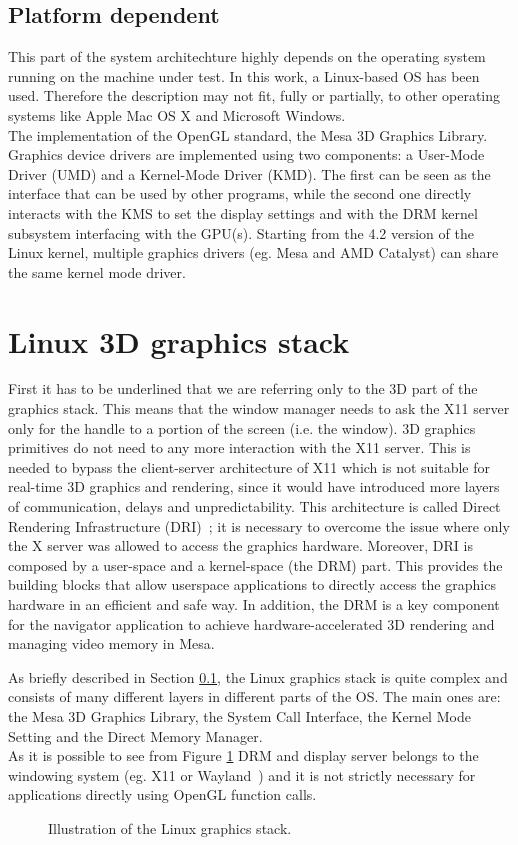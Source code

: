 \subsection{Platform dependent} \label{sec:platform_dependent}
This part of the system architechture highly depends on the operating system
running on the machine under test. In this work, a Linux-based OS has been used.
Therefore the description may not fit, fully or partially, to other operating
systems like Apple Mac OS X and Microsoft Windows.\\
The implementation of the OpenGL standard, the Mesa 3D Graphics Library. 
Graphics device drivers are implemented using two components: a User-Mode Driver
(UMD) and a Kernel-Mode Driver (KMD). The first can be seen as the interface
that can be used by other programs, while the second one directly interacts
with the KMS to set the display settings and with the DRM kernel subsystem
interfacing with the GPU(s). Starting from the 4.2 version of the Linux kernel,
multiple graphics drivers (eg. Mesa and AMD Catalyst) can share the same kernel
mode driver.


\section{Linux 3D graphics stack}
First it has to be underlined that we are referring only to the 3D part of the
graphics stack. This means that the window manager needs to ask the X11 server
only for the handle to a portion of the screen (i.e. the window).
3D graphics primitives do not need to any more interaction with the X11 server. This
is needed to bypass the client-server architecture of X11 which is not suitable for
real-time 3D graphics and rendering, since it would have introduced more layers
of communication, delays and unpredictability. This architecture is called
Direct Rendering Infrastructure (DRI)~\cite{paul2000introduction}; it is
necessary to overcome the issue where only the X server was allowed to access
the graphics hardware. Moreover, DRI is composed by a user-space and a kernel-space
(the DRM) part. This provides the building blocks that allow userspace applications
to directly access the graphics hardware in an efficient and safe way.
In addition, the DRM is a key component for the navigator application to achieve
hardware-accelerated 3D rendering and managing video memory in Mesa.

As briefly described in Section \ref{sec:platform_dependent}, the Linux graphics
stack is quite complex and consists of many different layers in different parts
of the OS. The main ones are: the Mesa 3D Graphics Library, the System Call
Interface, the Kernel Mode Setting and the Direct Memory Manager.\\
As it is possible to see from Figure \ref{img:linux_graphics_stack} DRM and 
display server belongs to the windowing system (eg. X11 or Wayland~\cite{wayland}) 
and it is not strictly necessary for applications directly using OpenGL function
calls.
\begin{figure}[!htb]\label{img:linux_graphics_stack}
    \caption{Illustration of the Linux graphics stack.}
\end{figure} 

